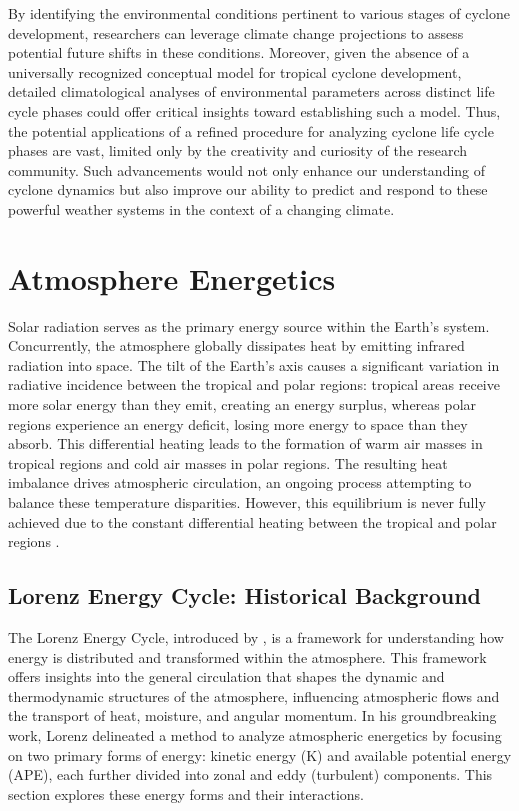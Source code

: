 By identifying the environmental conditions pertinent to various stages of cyclone development, researchers can leverage climate change projections to assess potential future shifts in these conditions. Moreover, given the absence of a universally recognized conceptual model for tropical cyclone development, detailed climatological analyses of environmental parameters across distinct life cycle phases could offer critical insights toward establishing such a model. Thus, the potential applications of a refined procedure for analyzing cyclone life cycle phases are vast, limited only by the creativity and curiosity of the research community. Such advancements would not only enhance our understanding of cyclone dynamics but also improve our ability to predict and respond to these powerful weather systems in the context of a changing climate.

\section{Atmosphere Energetics}\label{atmosphere_energetics}

Solar radiation serves as the primary energy source within the Earth's system. Concurrently, the atmosphere globally dissipates heat by emitting infrared radiation into space. The tilt of the Earth's axis causes a significant variation in radiative incidence between the tropical and polar regions: tropical areas receive more solar energy than they emit, creating an energy surplus, whereas polar regions experience an energy deficit, losing more energy to space than they absorb. This differential heating leads to the formation of warm air masses in tropical regions and cold air masses in polar regions. The resulting heat imbalance drives atmospheric circulation, an ongoing process attempting to balance these temperature disparities. However, this equilibrium is never fully achieved due to the constant differential heating between the tropical and polar regions \citep{stull2015practical}.

\subsection{Lorenz Energy Cycle: Historical Background}

The Lorenz Energy Cycle, introduced by \citet{lorenz1955}, is a framework for understanding how energy is distributed and transformed within the atmosphere. This framework offers insights into the general circulation that shapes the dynamic and thermodynamic structures of the atmosphere, influencing atmospheric flows and the transport of heat, moisture, and angular momentum. In his groundbreaking work, Lorenz delineated a method to analyze atmospheric energetics by focusing on two primary forms of energy: kinetic energy (K) and available potential energy (APE), each further divided into zonal and eddy (turbulent) components. This section explores these energy forms and their interactions.

